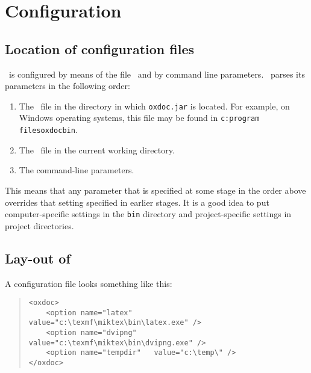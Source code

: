 
\newenvironment{options}{}{}
\newcommand{\option}[2]{\par\noindent\hspace{-6pt}\begin{tabular}{p{1.5in}p{4.95in}}\tt #1 & #2 \medskip \end{tabular}}


\chapter{Configuration}

\section{Location of configuration files}
\oxdoc~is configured by means of the file \oxdocxml~and
by command line parameters.
\oxdoc~parses its parameters in the following order:
\begin{enumerate}
\item The \oxdocxml~file in the directory in which {\tt oxdoc.jar}
is located. For example, on Windows operating systems, this file may be found 
in {\tt c:\bs program files\bs oxdoc\bs bin}.
\item The \oxdocxml~file in the current working directory.
\item The command-line parameters.
\end{enumerate}
This means that any parameter that is specified at some stage
in the order above overrides that setting specified in earlier stages.
It is a good idea to put computer-specific settings in the {\tt bin}
directory and project-specific settings in project directories. 

\section{Lay-out of \oxdocxml}
A configuration file looks something like this:

\begin{quote}
\small\begin{verbatim}
<oxdoc>
	<option name="latex"     value="c:\texmf\miktex\bin\latex.exe" />
	<option name="dvipng"    value="c:\texmf\miktex\bin\dvipng.exe" />
	<option name="tempdir"   value="c:\temp\" />
</oxdoc>
\end{verbatim}
\end{quote}


